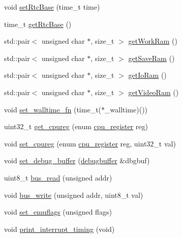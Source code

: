 \begin{DoxyCompactItemize}
\item 
void \hyperlink{classgambatte_1_1GB_a6beebe28f631880573d8e6a91ceb675f}{set\+Rtc\+Base} (time\+\_\+t time)
\item 
time\+\_\+t \hyperlink{classgambatte_1_1GB_a8fd5bd2699640686ad21e211ca841c2f}{get\+Rtc\+Base} ()
\item 
std\+::pair$<$ unsigned char $\ast$, size\+\_\+t $>$ \hyperlink{classgambatte_1_1GB_a0781cb0969c57ddc0fa647b54ee373f6}{get\+Work\+Ram} ()
\item 
std\+::pair$<$ unsigned char $\ast$, size\+\_\+t $>$ \hyperlink{classgambatte_1_1GB_aef4cbcec5818d26bef8c54cedf007e17}{get\+Save\+Ram} ()
\item 
std\+::pair$<$ unsigned char $\ast$, size\+\_\+t $>$ \hyperlink{classgambatte_1_1GB_af97601bcf082aafab539a6922f36beb8}{get\+Io\+Ram} ()
\item 
std\+::pair$<$ unsigned char $\ast$, size\+\_\+t $>$ \hyperlink{classgambatte_1_1GB_af72f3d0e4a022d737bff406d3327038b}{get\+Video\+Ram} ()
\item 
void \hyperlink{classgambatte_1_1GB_a910300b95fe3c38e7d6c0b3f11c017c5}{set\+\_\+walltime\+\_\+fn} (time\+\_\+t($\ast$\+\_\+walltime)())
\item 
uint32\+\_\+t \hyperlink{classgambatte_1_1GB_a5d93be3dc403febfd05f65987fffbd96}{get\+\_\+cpureg} (enum \hyperlink{classgambatte_1_1GB_afbfe723d7a5e73582401f77c75d13893}{cpu\+\_\+register} reg)
\item 
void \hyperlink{classgambatte_1_1GB_a4c4ac99f71f96e9c8a0ae7b5ad1a2245}{set\+\_\+cpureg} (enum \hyperlink{classgambatte_1_1GB_afbfe723d7a5e73582401f77c75d13893}{cpu\+\_\+register} reg, uint32\+\_\+t val)
\item 
void \hyperlink{classgambatte_1_1GB_a87d311a79eef1d8a812cbd8ba82f0715}{set\+\_\+debug\+\_\+buffer} (\hyperlink{structgambatte_1_1debugbuffer}{debugbuffer} \&dbgbuf)
\item 
uint8\+\_\+t \hyperlink{classgambatte_1_1GB_acafddce904037bfa513b7b27f0f4ffae}{bus\+\_\+read} (unsigned addr)
\item 
void \hyperlink{classgambatte_1_1GB_a060622967acdfc0ff693dedc39d9d187}{bus\+\_\+write} (unsigned addr, uint8\+\_\+t val)
\item 
void \hyperlink{classgambatte_1_1GB_a46e4849dcde049e8667cd282864389d5}{set\+\_\+emuflags} (unsigned flags)
\item 
void \hyperlink{classgambatte_1_1GB_a8efc0744b106fb4163e048b8c5f0ca61}{print\+\_\+interrupt\+\_\+timing} (void)
\end{DoxyCompactItemize}
